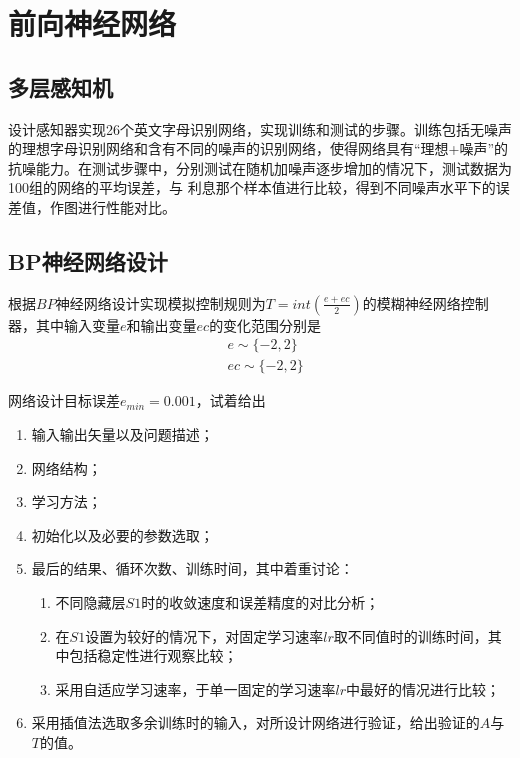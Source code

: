 \chapter{前向神经网络}

\section{多层感知机}

\begin{question}
    设计感知器实现26个英文字母识别网络，实现训练和测试的步骤。训练包括无噪声的理想字母识别网络和含有不同的噪声的识别网络，使得网络具有“理想+噪声”的抗噪能力。在测试步骤中，分别测试在随机加噪声逐步增加的情况下，测试数据为100组的网络的平均误差，与
    利息那个样本值进行比较，得到不同噪声水平下的误差值，作图进行性能对比。
\end{question}

\section{BP神经网络设计}

\begin{question}
    根据$BP$神经网络设计实现模拟控制规则为$T=int\left(\frac{e+ec}{2}\right)$的模糊神经网络控制器，其中输入变量$e$和输出变量$ec$的变化范围分别是
    \begin{equation}
        \begin{aligned}
            & e\sim \{-2,2\}\\
            & ec\sim \{-2,2\}
        \end{aligned}
    \end{equation}

    网络设计目标误差$e_{min}=0.001$，试着给出
    \begin{enumerate}[itemindent=2em]
        \item 输入输出矢量以及问题描述；
        \item 网络结构；
        \item 学习方法；
        \item 初始化以及必要的参数选取；
        \item 最后的结果、循环次数、训练时间，其中着重讨论：
        \begin{enumerate}[itemindent=2em]
            \item 不同隐藏层$S1$时的收敛速度和误差精度的对比分析；
            \item 在$S1$设置为较好的情况下，对固定学习速率$lr$取不同值时的训练时间，其中包括稳定性进行观察比较；
            \item 采用自适应学习速率，于单一固定的学习速率$lr$中最好的情况进行比较；
        \end{enumerate}
        \item 采用插值法选取多余训练时的输入，对所设计网络进行验证，给出验证的$A$与$T$的值。
    \end{enumerate}
\end{question}

